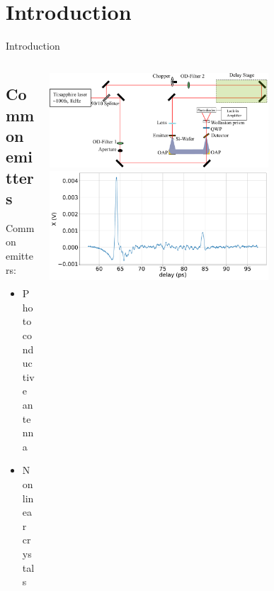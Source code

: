 \documentclass[aspectratio=1610, 9pt]{beamer}
\begin{document}
\section{Introduction}
\begin{frame}{Introduction}
\begin{columns}
  \begin{column}{.3\textwidth}
    \subsection{Common emitters}
    {\Large Common emitters:}
    \normalsize
    \vspace{0.3in}
    \begin{itemize}
      \item Photo conductive antenna 
      \vspace{0.3in}
      \item{Nonlinear crystals}
    \end{itemize}
  \end{column}
  \begin{column}{.7\textwidth}
    \includegraphics[width=0.7\textwidth]{images/Aufbau.pdf}
  \vspace{0.3in}
    \includegraphics[width=0.7\textwidth]{images/2_11_30_20normalX.pdf}
  \end{column}
\end{columns}
\end{frame}
\end{document}
